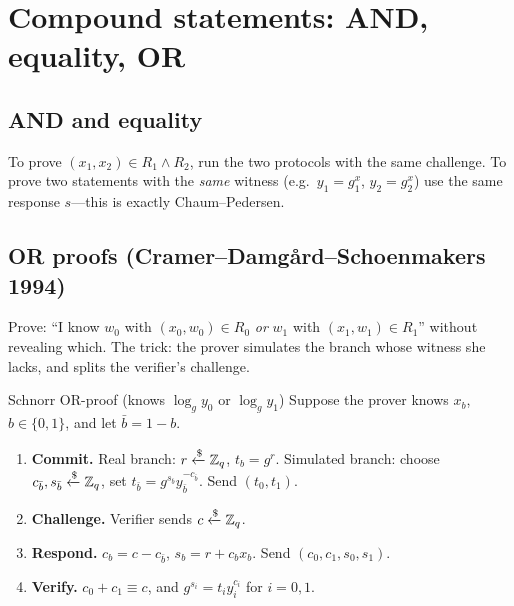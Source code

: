 \documentclass[11pt,a4paper]{report}
\theoremstyle{plain}
\theoremstyle{definition}
\theoremstyle{remark}
\newcommand{\getsr}{\xleftarrow{\$}}
\begin{document}
\section{Compound statements: AND, equality, OR}
\subsection{AND and equality}
To prove $(x_1,x_2)\in R_1\wedge R_2$, run the two protocols with the same challenge. To prove two statements with the \emph{same} witness (e.g.\ $y_1=g_1^x$, $y_2=g_2^x$) use the same response $s$---this is exactly Chaum--Pedersen.

\subsection{OR proofs (Cramer--Damgård--Schoenmakers 1994)}
Prove: ``I know $w_0$ with $(x_0,w_0)\in R_0$ \emph{or} $w_1$ with $(x_1,w_1)\in R_1$'' without revealing which. The trick: the prover simulates the branch whose witness she lacks, and splits the verifier's challenge.
\begin{protocol}[label=pr:or]{Schnorr OR-proof (knows $\log_gy_0$ or $\log_gy_1$)}
Suppose the prover knows $x_b$, $b\in\{0,1\}$, and let $\bar b=1-b$.
\begin{enumerate}
\item \textbf{Commit.} Real branch: $r\getsr\ZZ_q$, $t_b=g^r$. Simulated branch: choose $c_{\bar b},s_{\bar b}\getsr\ZZ_q$, set $t_{\bar b}=g^{s_{\bar b}}y_{\bar b}^{-c_{\bar b}}$. Send $(t_0,t_1)$.
\item \textbf{Challenge.} Verifier sends $c\getsr\ZZ_q$.
\item \textbf{Respond.} $c_b=c-c_{\bar b}$, $s_b=r+c_bx_b$. Send $(c_0,c_1,s_0,s_1)$.
\item \textbf{Verify.} $c_0+c_1\equiv c$, and $g^{s_i}=t_iy_i^{c_i}$ for $i=0,1$.
\end{enumerate}
\end{protocol}
\end{document}
